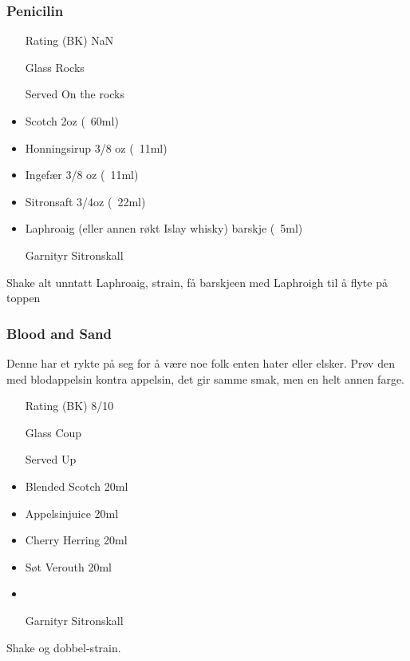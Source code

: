 \subsubsection{Penicilin}
\begin{itemize}
    \item[Rating (BK)] NaN
    \item[Glass] Rocks
    \item[Served] On the rocks
    \item Scotch 2oz (~60ml)
    \item Honningsirup 3/8 oz (~11ml)
    \item Ingefær 3/8 oz (~11ml)
    \item Sitronsaft 3/4oz (~22ml)
    \item Laphroaig (eller annen røkt Islay whisky) barskje (~5ml)
    \item[Garnityr] Sitronskall
\end{itemize}
Shake alt unntatt Laphroaig, strain, få barskjeen med Laphroigh til å flyte på toppen

\subsubsection{Blood and Sand}
Denne har et rykte på seg for å være noe folk enten hater eller elsker.
Prøv den med blodappelsin kontra appelsin, det gir samme smak, men en helt annen farge.
\begin{itemize}
    \item[Rating (BK)] 8/10
    \item[Glass] Coup
    \item[Served] Up
    \item Blended Scotch 20ml
    \item Appelsinjuice 20ml
    \item Cherry Herring 20ml
    \item Søt Verouth 20ml
    \item 
    \item[Garnityr] Sitronskall
\end{itemize}
Shake og dobbel-strain.
